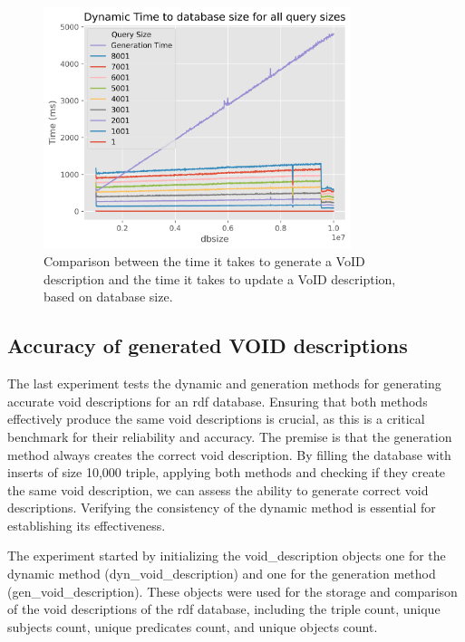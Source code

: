 \begin{figure}[t]
    \centering
    \includegraphics[width=0.8\textwidth]{figures/comparison-Generation-vs-Update.png}
    \caption{Comparison between the time it takes to generate a VoID description and the time it takes to update a VoID description, based on database size.}
    \label{fig:comparison-generation-vs-update}
\end{figure}

\subsection{Accuracy of generated VOID descriptions}

The last experiment tests the dynamic and generation methods for generating accurate \gls{void} descriptions for an  \gls{rdf} database. Ensuring that both methods effectively produce the same \gls{void} descriptions is crucial, as this is a critical benchmark for their reliability and accuracy. The premise is that the generation method always creates the correct \gls{void} description. By filling the database with inserts of size 10,000 triple, applying both methods and checking if they create the same \gls{void} description, we can assess the ability to generate correct \gls{void} descriptions. Verifying the consistency of the dynamic method is essential for establishing its effectiveness.


The experiment started by initializing the \gls{void}\_description objects one for the dynamic method (dyn\_void\_description) and one for the generation method (gen\_void\_description). These objects were used for the storage and comparison of the \gls{void} descriptions of the  \gls{rdf} database, including the triple count, unique subjects count, unique predicates count, and unique objects count.

